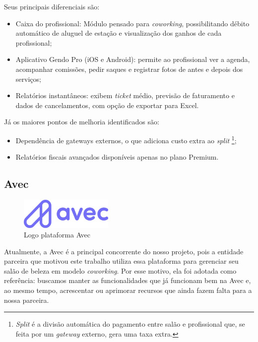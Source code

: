 Seus principais diferenciais são:
\begin{itemize}
	\item Caixa do profissional: Módulo pensado para \emph{coworking}, possibilitando débito automático de aluguel de estação e visualização dos ganhos de cada profissional;
	\item Aplicativo Gendo Pro (iOS e Android): permite ao profissional ver a agenda, acompanhar comissões, pedir saques e registrar fotos de antes e depois dos serviços;
	\item Relatórios instantâneos: exibem \emph{ticket} médio, previsão de faturamento e dados de cancelamentos, com opção de exportar para Excel.
\end{itemize}


Já os maiores pontos de melhoria identificados são:
\begin{itemize}
	\item Dependência de gateways externos, o que adiciona custo extra ao \emph{split} \footnote{\emph{Split} é a divisão automática do pagamento entre salão e profissional que, se feita por um \emph{gateway} externo, gera uma taxa extra.};
	\item Relatórios fiscais avançados disponíveis apenas no plano Premium.
\end{itemize}

\subsection{Avec}

\begin{figure}[htb]
	\centering
	\includegraphics[width=0.4\textwidth]{cap01-Introducao/Images/1.4.3_Avec}
	\caption{Logo plataforma Avec}
	\label{fig:Avec}
\end{figure}

 \FloatBarrier

Atualmente, a Avec é a principal concorrente do nosso projeto, pois a entidade parceira que motivou este trabalho utiliza essa plataforma para gerenciar seu salão de beleza em modelo \emph{coworking}. Por esse motivo, ela foi adotada como referência: buscamos manter as funcionalidades que já funcionam bem na Avec e, ao mesmo tempo, acrescentar ou aprimorar recursos que ainda fazem falta para a nossa parceira.

